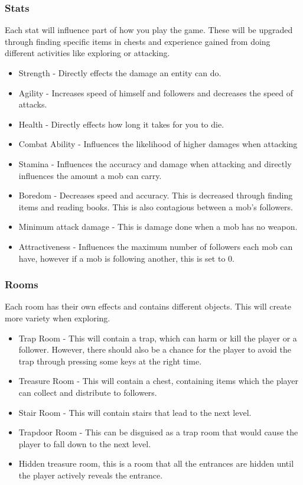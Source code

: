 \documentclass{article}
\begin{document}
            \subsubsection{Stats}
                Each stat will influence part of how you play the game. These will be upgraded through finding specific items in chests and experience gained from doing different activities like exploring or attacking.
                \begin{itemize}
                    \item Strength - Directly effects the damage an entity can do.
                    \item Agility - Increases speed of himself and followers and decreases the speed of attacks.
                    \item Health - Directly effects how long it takes for you to die.
                    \item Combat Ability - Influences the likelihood of higher damages when attacking
                    \item Stamina - Influences the accuracy and damage when attacking and directly influences the amount a mob can carry.
                    \item Boredom - Decreases speed and accuracy. This is decreased through finding items and reading books. This is also contagious between a mob's followers.
                    \item Minimum attack damage - This is damage done when a mob has no weapon.
                    \item Attractiveness - Influences the maximum number of followers each mob can have, however if a mob is following another, this is set to 0.
                \end{itemize}
            \subsubsection{Rooms}
                Each room has their own effects and contains different objects. This will create more variety when exploring.
                \begin{itemize}
                    \item Trap Room - This will contain a trap, which can harm or kill the player or a follower. However, there should also be a chance for the player to avoid the trap through pressing some keys at the right time.
                    \item Treasure Room - This will contain a chest, containing items which the player can collect and distribute to followers.
                    \item Stair Room - This will contain stairs that lead to the next level.
                    \item Trapdoor Room - This can be disguised as a trap room that would cause the player to fall down to the next level.
                    \item Hidden treasure room, this is a room that all the entrances are hidden until the player actively reveals the entrance.
                \end{itemize}
\end{document}
